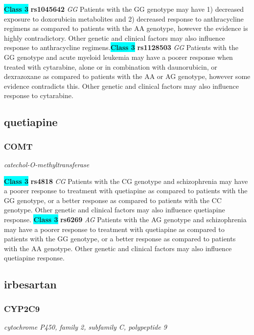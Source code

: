 \documentclass{report}
\begin{document}
\textbf{\colorbox{cyan} {Class 3}} \textbf{ rs1045642 } \textit{ GG }
Patients with the GG genotype may have 1) decreased exposure to doxorubicin metabolites and 2) decreased response to anthracycline regimens as compared to patients with the AA genotype, however the evidence is highly contradictory. Other genetic and clinical factors may also influence response to anthracycline regimens.\newline\textbf{\colorbox{cyan} {Class 3}} \textbf{ rs1128503 } \textit{ GG }
Patients with the GG genotype and acute myeloid leukemia may have a poorer response when treated with cytarabine, alone or in combination with daunorubicin, or dexrazoxane as compared to patients with the AA or AG genotype, however some evidence contradicts this. Other genetic and clinical factors may also influence response to cytarabine.\newline\subsection{ quetiapine }\subsubsection{ COMT }
\textit{ catechol-O-methyltransferase }

\textbf{\colorbox{cyan} {Class 3}} \textbf{ rs4818 } \textit{ CG }
Patients with the CG genotype and schizophrenia may have a poorer response to treatment with quetiapine as compared to patients with the GG genotype, or a better response as compared to patients with the CC genotype. Other genetic and clinical factors may also influence quetiapine response. \newline\textbf{\colorbox{cyan} {Class 3}} \textbf{ rs6269 } \textit{ AG }
Patients with the AG genotype and schizophrenia may have a poorer response to treatment with quetiapine as compared to patients with the GG genotype, or a better response as compared to patients with the AA genotype. Other genetic and clinical factors may also influence quetiapine response. \newline\subsection{ irbesartan }\subsubsection{ CYP2C9 }
\textit{ cytochrome P450, family 2, subfamily C, polypeptide 9 }
\end{document}
